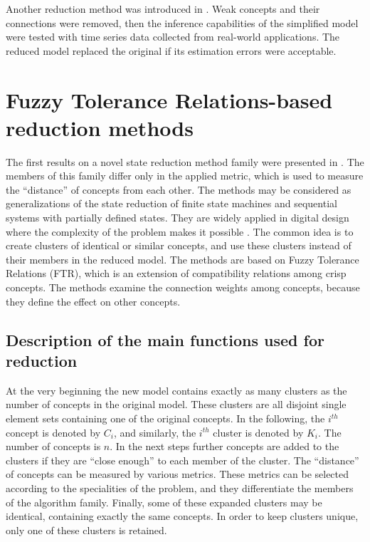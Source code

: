 \documentclass[graybox]{svmult}
\begin{document}
Another reduction method was introduced in \cite{Homenda2014}. Weak concepts and their connections were removed, then the inference capabilities of the simplified model were tested with time series data collected from real-world applications. The reduced model replaced the original if its estimation errors were acceptable.

\section{Fuzzy Tolerance Relations-based reduction methods}
\label{sec:2}

The first results on a novel state reduction method family were presented in \cite{hatwagner2014strategic,hatwagner2015new}. The members of this family differ only in the applied metric, which is used to measure the ``distance'' of concepts from each other. The methods may be considered as generalizations of the state reduction of finite state machines and sequential systems with partially defined states. They are widely applied in digital design where the complexity of the problem makes it possible \cite{kohaviz.jhan.k.2009}. The common idea is to create clusters of identical or similar concepts, and use these clusters instead of their members in the reduced model. The methods are based on Fuzzy Tolerance Relations (FTR), which is an extension of compatibility relations among crisp concepts. The methods examine the connection weights among concepts, because they define the effect on other concepts.

\subsection{Description of the main functions used for reduction}

At the very beginning the new model contains exactly as many clusters as the number of concepts in the original model. These clusters are all disjoint single element sets containing one of the original concepts. In the following, the $i^{th}$ concept is denoted by $C_i$, and similarly, the $i^{th}$ cluster is denoted by $K_i$. The number of concepts is $n$. In the next steps further concepts are added to the clusters if they are ``close enough'' to each member of the cluster. The ``distance'' of concepts can be measured by various metrics. These metrics can be selected according to the specialities of the problem, and they differentiate the members of the algorithm family. Finally, some of these expanded clusters may be identical, containing exactly the same concepts. In order to keep clusters unique, only one of these clusters is retained.
\end{document}
